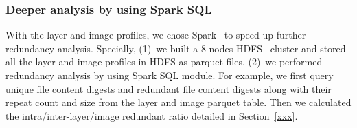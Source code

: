 \subsubsection{Deeper analysis by using Spark SQL}

With the layer and image profiles, we chose Spark~\cite{xxx} to speed up further redundancy analysis. Specially, (1)~we built a 8-nodes HDFS~\cite{xxx} cluster and stored all the layer and image profiles in HDFS as parquet files. (2)~we performed redundancy analysis by using Spark SQL module. For example, we first query unique file content digests and redundant file content digests along with their repeat count and size from the layer and image parquet table. Then we calculated the intra/inter-layer/image redundant ratio detailed in Section~\ref{xxx}.


%
%
%


